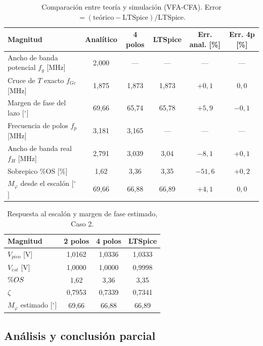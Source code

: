 \begin{table}[H]
\centering
\caption{Comparación entre teoría y simulación (VFA-CFA). Error $= (\text{teórico}-\text{LTSpice})/\text{LTSpice}$.}
\label{tab:final_c2}
\small
\setlength{\tabcolsep}{4pt}
\begin{tabularx}{\textwidth}{>{\raggedright\arraybackslash}X c c c c c}
\toprule
\textbf{Magnitud} & \textbf{Analítico} & \textbf{4 polos} & \textbf{LTSpice} & \textbf{Err. anal. [\%]} & \textbf{Err. 4p [\%]} \\
\midrule
Ancho de banda potencial $f_g$ [MHz] & 2,000 & --- & --- & --- & --- \\
Cruce de $T$ exacto $f_{Gc}$ [MHz] & 1,875 & 1,873 & 1,873 & $+0{,}1$ & $0{,}0$ \\
Margen de fase del lazo [$^\circ$] & 69,66 & 65,74 & 65,78 & $+5{,}9$ & $-0{,}1$ \\
Frecuencia de polos $f_p$ [MHz] & 3,181 & 3,165 & --- & --- & --- \\
Ancho de banda real $f_H$ [MHz] & 2,791 & 3,039 & 3,04 & $-8{,}1$ & $+0{,}1$ \\
Sobrepico \%OS [\%] & 1,62 & 3,36 & 3,35 & $-51{,}6$ & $+0{,}2$ \\
$M_\varphi$ desde el escalón [$^\circ$] & 69,66 & 66,88 & 66,89 & $+4{,}1$ & $0{,}0$ \\
\bottomrule
\end{tabularx}
\end{table}

\begin{table}[H]
\centering
\caption{Respuesta al escalón y margen de fase estimado, Caso 2.}
\label{tab:escalon_c2}
\begin{tabular}{lccc}
\toprule
\textbf{Magnitud} & \textbf{2 polos} & \textbf{4 polos} & \textbf{LTSpice} \\
\midrule
$V_{pico}$ [V] & 1,0162 & 1,0336 & 1,0333 \\
$V_{est}$ [V] & 1,0000 & 1,0000 & 0,9998 \\
$\mathrm{\char37}OS$ & 1,62 & 3,36 & 3,35 \\
$\zeta$ & 0,7953 & 0,7339 & 0,7341 \\
$M_\varphi$ estimado [$^\circ$] & 69,66 & 66,88 & 66,89 \\
\bottomrule
\end{tabular}
\end{table}

\subsection{Análisis y conclusión parcial}
\label{sec:concl_c2}

